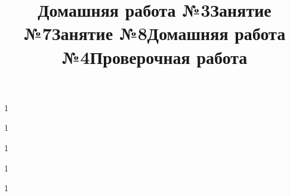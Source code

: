 \newpage
\title{Домашняя работа №3}
\begin{listofex}
	\item 1
	
\end{listofex}
\newpage
\title{Занятие №7}
\begin{listofex}
	\item 1
	
\end{listofex}
\newpage
\title{Занятие №8}
\begin{listofex}
	\item 1
	
\end{listofex}
\newpage
\title{Домашняя работа №4}
\begin{listofex}
	\item 1
	
\end{listofex}
\newpage
\title{Проверочная работа}
\begin{listofex}
	\item 1
	
\end{listofex}